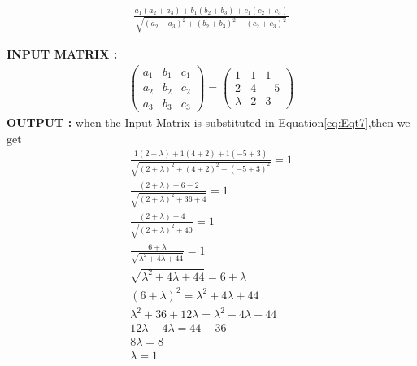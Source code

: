 \documentclass[11pt, a4paper]{article}
\newcommand{\myvec}[1]{\ensuremath{\begin{pmatrix}#1\end{pmatrix}}}
\begin{document}
\begin{enumerate}
\begin{enumerate}
      \begin{align}
          \frac{a_1(a_2+a_3)+b_1(b_2+b_3)+c_1(c_2+c_3)}{\sqrt{(a_2+a_3)^2+(b_2+b_3)^2+(c_2+c_3)^2}}\label{eq:Eqt7}
      \end{align}
\end{enumerate}
\textbf{INPUT MATRIX :}
\begin{align}
 \myvec{a_1&b_1&c_1\\a_2&b_2&c_2\\a_3&b_3&c_3}=\myvec{1 & 1 & 1\\ 2 & 4& -5 \\ \lambda &2 &3}\label{eq:Eq8}
\end{align}
\textbf{OUTPUT :}
    when the Input Matrix is substituted in Equation\eqref{eq:Eqt7},then we get
\begin{align}
    \frac{1(2+\lambda)+1(4+2)+1(-5+3)}{\sqrt{(2+\lambda)^2+(4+2)^2+(-5+3)^2}}=1\\
\frac{(2+\lambda)+6-2}{\sqrt{(2+\lambda)^2+36+4}}=1\\
\frac{(2+\lambda)+4}{\sqrt{(2+\lambda)^2+40}}=1\\
\frac{6+\lambda}{\sqrt{\lambda^2+4\lambda+44}}=1\\
\sqrt{\lambda^2+4\lambda+44}=6+\lambda\\
(6+\lambda)^2=\lambda^2+4\lambda+44\\
\lambda^2+36+12\lambda=\lambda^2+4\lambda+44\\
12\lambda-4\lambda=44-36\\
8\lambda=8\\
\lambda=1
\end{align}
\end{enumerate}
\end{document}
